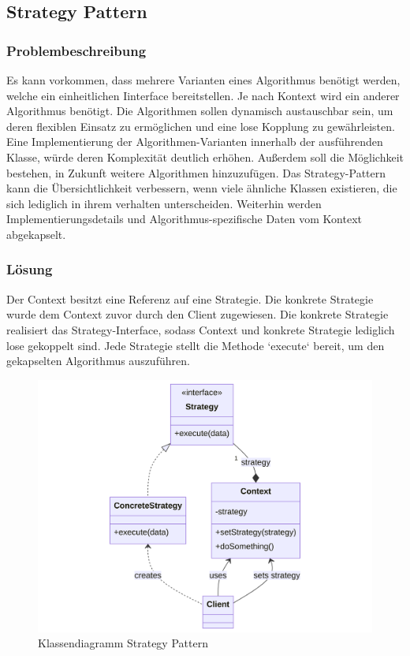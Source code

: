 \subsection{Strategy Pattern}

\subsubsection*{Problembeschreibung}

Es kann vorkommen, dass mehrere Varianten eines Algorithmus benötigt werden, welche ein einheitlichen Iinterface bereitstellen. Je nach Kontext wird ein anderer Algorithmus benötigt. Die Algorithmen sollen dynamisch austauschbar sein, um deren flexiblen Einsatz zu ermöglichen und eine lose Kopplung zu gewährleisten. Eine Implementierung der Algorithmen-Varianten innerhalb der ausführenden Klasse, würde deren Komplexität deutlich erhöhen. Außerdem soll die Möglichkeit bestehen, in Zukunft weitere Algorithmen hinzuzufügen. Das Strategy-Pattern kann die Übersichtlichkeit verbessern, wenn viele ähnliche Klassen existieren, die sich lediglich in ihrem verhalten unterscheiden. Weiterhin werden Implementierungsdetails und Algorithmus-spezifische Daten vom Kontext abgekapselt.

\subsubsection*{Lösung}

Der Context besitzt eine Referenz auf eine Strategie. Die konkrete Strategie wurde dem Context zuvor durch den Client zugewiesen. Die konkrete Strategie realisiert das Strategy-Interface, sodass Context und konkrete Strategie lediglich lose gekoppelt sind. Jede Strategie stellt die Methode `execute` bereit, um den gekapselten Algorithmus auszuführen. 

\begin{figure}[!hb]
	\centering
	\includegraphics[width=0.75\linewidth]{images/patterns/strategy-class.png}
	\caption{Klassendiagramm Strategy Pattern}
	\label{fig:strategy-class}
\end{figure}

